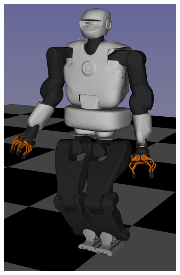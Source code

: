 \begin{figure}[t]
\begin{subfigure}[b]{0.32\textwidth}
        \includegraphics[width=\columnwidth]{chapter_flexible_joints/figures/talos_2.png}
    \end{subfigure}
    \hfill
     \begin{subfigure}[b]{0.32\textwidth}
        \centering

\end{subfigure}
\end{figure}
